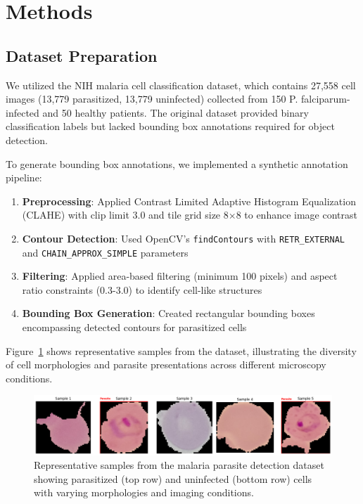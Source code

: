 \documentclass[10pt,twocolumn]{article}
\begin{document}
\section{Methods}

\subsection{Dataset Preparation}

We utilized the NIH malaria cell classification dataset, which contains 27,558 cell images (13,779 parasitized, 13,779 uninfected) collected from 150 P. falciparum-infected and 50 healthy patients. The original dataset provided binary classification labels but lacked bounding box annotations required for object detection.

To generate bounding box annotations, we implemented a synthetic annotation pipeline:

\begin{enumerate}
\item \textbf{Preprocessing}: Applied Contrast Limited Adaptive Histogram Equalization (CLAHE) with clip limit 3.0 and tile grid size 8×8 to enhance image contrast
\item \textbf{Contour Detection}: Used OpenCV's \texttt{findContours} with \texttt{RETR\_EXTERNAL} and \texttt{CHAIN\_APPROX\_SIMPLE} parameters
\item \textbf{Filtering}: Applied area-based filtering (minimum 100 pixels) and aspect ratio constraints (0.3-3.0) to identify cell-like structures
\item \textbf{Bounding Box Generation}: Created rectangular bounding boxes encompassing detected contours for parasitized cells
\end{enumerate}

Figure~\ref{fig:dataset_samples} shows representative samples from the dataset, illustrating the diversity of cell morphologies and parasite presentations across different microscopy conditions.

\begin{figure}[H]
\centering
\includegraphics[width=0.8\columnwidth]{dataset_samples.png}
\caption{Representative samples from the malaria parasite detection dataset showing parasitized (top row) and uninfected (bottom row) cells with varying morphologies and imaging conditions.}
\label{fig:dataset_samples}
\end{figure}
\end{document}
